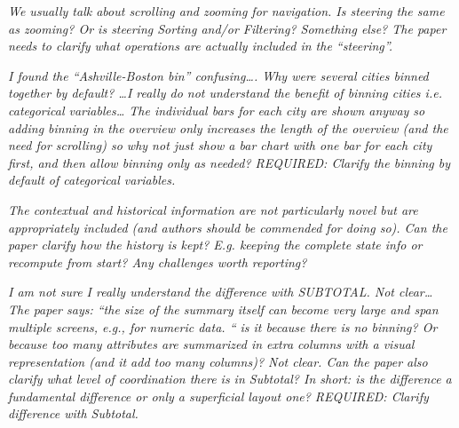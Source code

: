  


 \textit{We usually talk about scrolling and zooming for navigation.  Is steering the same
    as zooming?  Or is steering Sorting and/or Filtering?  Something else?  The paper
    needs to clarify what operations are actually included in the “steering”.}

 

 \textit{I found the “Ashville-Boston bin” confusing…. Why were several cities binned
    together by default? \ldots I really do not understand the benefit of binning cities i.e. categorical
    variables… The individual bars for each city are shown anyway so adding binning in
    the overview only increases the length of the overview (and the need for
    scrolling) so why not just show a bar chart with one bar for each city first, and
    then allow binning only as needed?
    REQUIRED: Clarify the binning by default of categorical variables.}
    
  

 \textit{The contextual and historical information are not particularly novel but are
    appropriately included (and authors should be commended for doing so).   Can the
    paper clarify how the history is kept?  E.g. keeping the complete state info or
    recompute from start? Any challenges worth reporting?}

    


 \textit{I am not sure I really understand the difference with SUBTOTAL. Not clear…
    The paper says: “the size of the summary itself can become very large and
    span multiple screens, e.g., for numeric data. “ is it because there is no
    binning? Or because too many attributes are summarized in extra columns with a
    visual representation (and it add too many columns)?   Not clear.   Can the paper
    also clarify what level of coordination there is in Subtotal? In short: is the
    difference a fundamental difference or only a superficial layout one?
    REQUIRED: Clarify difference with Subtotal.}

